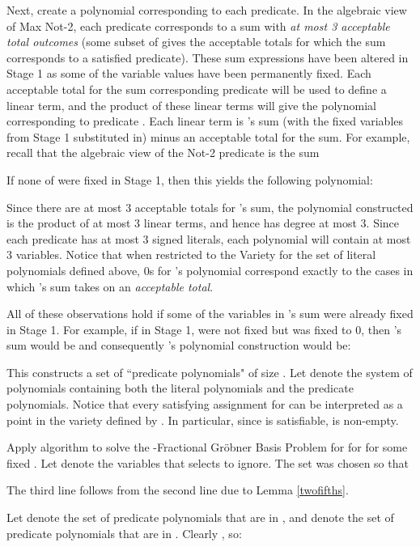 \documentclass{article}
\begin{document}
Next, create a polynomial corresponding to each predicate. In the algebraic view of Max Not-2, each predicate  corresponds to a sum with \textit{at most 3 acceptable total outcomes} (some subset of  gives the acceptable totals for which the sum corresponds to a satisfied predicate). These sum expressions have been altered in Stage 1 as some of the variable values have been permanently fixed. Each acceptable total for the sum corresponding predicate  will be used to define a linear term, and the product of these linear terms will give the polynomial corresponding to predicate . Each linear term is 's sum (with the fixed variables from Stage 1 substituted in) minus an acceptable total for the sum. For example, recall that the algebraic view of the Not-2 predicate  is the sum

If none of  were fixed in Stage 1, then this yields the following polynomial:

Since there are at most 3 acceptable totals for 's sum, the polynomial constructed is the product of at most 3 linear terms, and hence has degree at most 3. Since each predicate has at most 3 signed literals, each polynomial will contain at most 3 variables. Notice that when restricted to the Variety for the set of literal polynomials defined above, 0s for 's polynomial correspond exactly to the cases in which 's sum takes on an \textit{acceptable total}. 

All of these observations hold if some of the variables in 's sum were already fixed in Stage 1. For example, if in Stage 1,  were not fixed but  was fixed to 0, then 's sum would be  and consequently 's polynomial construction would be: 


This constructs a set of ``predicate polynomials" of size . Let  denote the system of polynomials containing both the literal polynomials and the predicate polynomials. Notice that every satisfying assignment for  can be interpreted as a point in the variety defined by . In particular, since  is satisfiable,  is non-empty.

Apply algorithm  to solve the -Fractional Gr\"{o}bner Basis Problem for  for  for some fixed . Let  denote the variables that  selects to ignore. The set  was chosen so that

The third line follows from the second line due to Lemma \ref{twofifths}. 

Let  denote the set of predicate polynomials that are in , and  denote the set of predicate polynomials that are in . Clearly , so:
\end{document}
